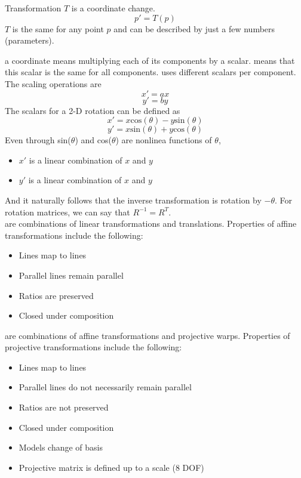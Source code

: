 \documentclass{article}
\begin{document}
\begin{definition}
  Transformation $T$ is a coordinate change. $$p' = T(p)$$ $T$ is the same for any point $p$ and can be described by just a few numbers (parameters). 
\end{definition}

 a coordinate means multiplying each of its components by a scalar.  means that this scalar is the same for all components.  uses different scalars per component. The scaling operations are $$x' = ax$$ $$y' = by$$ The scalars for a 2-D rotation can be defined as $$x' = x \textrm{cos}(\theta) - y \textrm{sin}(\theta)$$ $$y' = x \textrm{sin}(\theta) + y \textrm{cos}(\theta)$$ Even through sin($\theta$) and cos($\theta$) are nonlinea functions of $\theta$, 
\begin{itemize}
  \item $x'$ is a linear combination of $x$ and $y$ 
  \item $y'$ is a linear combination of $x$ and $y$
\end{itemize}
And it naturally follows that the inverse transformation is rotation by $- \theta$. For rotation matrices, we can say that $R^{-1} = R^T$. \\ 

 are combinations of linear transformations and translations. Properties of affine transformations include the following: 
\begin{itemize}
  \item Lines map to lines 
  \item Parallel lines remain parallel 
  \item Ratios are preserved 
  \item Closed under composition 
\end{itemize}

 are combinations of affine transformations and projective warps. Properties of projective transformations include the following: 
\begin{itemize}
  \item Lines map to lines 
  \item Parallel lines do not necessarily remain parallel 
  \item Ratios are not preserved 
  \item Closed under composition 
  \item Models change of basis 
  \item Projective matrix is defined up to a scale (8 DOF)
\end{itemize}
\end{document}
